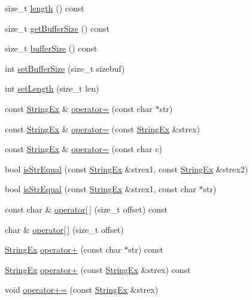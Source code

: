 \begin{CompactItemize}
\item 
size\_\-t \hyperlink{classStringEx_d377a20ec6e6ca28e8c470189903a87d}{length} () const 
\item 
size\_\-t \hyperlink{classStringEx_2705e22703e3754243608d8133c1b791}{getBufferSize} () const 
\item 
size\_\-t \hyperlink{classStringEx_eaf8859daeb95f1380c814740af5b5d4}{bufferSize} () const 
\item 
int \hyperlink{classStringEx_5e44f7dfc41db9f4ff1e25a353464ff0}{setBufferSize} (size\_\-t sizebuf)
\item 
int \hyperlink{classStringEx_0584545ceedd9c318a1c59bb0e346001}{setLength} (size\_\-t len)
\item 
const \hyperlink{classStringEx}{StringEx} \& \hyperlink{classStringEx_9bf02ac98235d7041562939b87512bac}{operator=} (const char $\ast$str)
\item 
const \hyperlink{classStringEx}{StringEx} \& \hyperlink{classStringEx_1071b3e23def59810d2a7d97a134cd72}{operator=} (const \hyperlink{classStringEx}{StringEx} \&strex)
\item 
const \hyperlink{classStringEx}{StringEx} \& \hyperlink{classStringEx_e6556e9e33cf433bc5ce65c2cc709907}{operator=} (const char c)
\item 
bool \hyperlink{classStringEx_61b66936040c448bf70622d9790d0a9f}{isStrEqual} (const \hyperlink{classStringEx}{StringEx} \&strex1, const \hyperlink{classStringEx}{StringEx} \&strex2)
\item 
bool \hyperlink{classStringEx_007fa6803dbc3544d17eaba7b8d56a07}{isStrEqual} (const \hyperlink{classStringEx}{StringEx} \&strex1, const char $\ast$str)
\item 
const char \& \hyperlink{classStringEx_9d84497552f7c6adfd065bfb4f40f9c2}{operator\mbox{[}$\,$\mbox{]}} (size\_\-t offset) const 
\item 
char \& \hyperlink{classStringEx_bb126ddaf548a3432f55c2dada139f64}{operator\mbox{[}$\,$\mbox{]}} (size\_\-t offset)
\item 
\hyperlink{classStringEx}{StringEx} \hyperlink{classStringEx_91f1a574ee859923b7e78523196aff40}{operator+} (const char $\ast$str) const 
\item 
\hyperlink{classStringEx}{StringEx} \hyperlink{classStringEx_3aa53b601611b0c5e6e38021cc85b95f}{operator+} (const \hyperlink{classStringEx}{StringEx} \&strex) const 
\item 
void \hyperlink{classStringEx_08601f0088a4c472e9485243e03fca16}{operator+=} (const \hyperlink{classStringEx}{StringEx} \&strex)

\end{CompactItemize}

